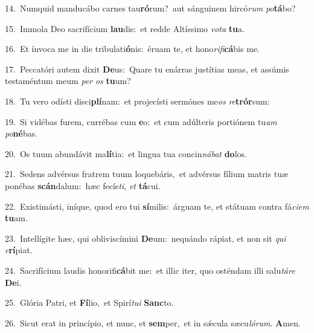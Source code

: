 {\numbfont\textcolor{\numbcolor}{14.}}~Numquid manducábo carnes tau\-\textbf{ró}\-rum?~\star aut sánguinem hircó\textit{rum} \textit{po}\-\textbf{tá}bo?\par
{\numbfont\textcolor{\numbcolor}{15.}}~Immola Deo sacrifícium \textbf{lau}\-dis:~\star et redde Altíssimo \textit{vo}\-\textit{ta} \textbf{tu}\-a.\par
{\numbfont\textcolor{\numbcolor}{16.}}~Et ínvoca me in die tribulati\-\textbf{ó}\-nis:~\star éruam te, et hono\-\textit{ri}\-\textit{fi}\textbf{cá}bis me.\par
{\numbfont\textcolor{\numbcolor}{17.}}~Peccatóri autem dixit \textbf{De}\-us:~\star Quare tu enárras justítias meas, et assúmis testaméntum meum \textit{per} \textit{os} \textbf{tu}\-um?\par
{\numbfont\textcolor{\numbcolor}{18.}}~Tu vero odísti disci\-\textbf{plí}\-nam:~\star et projecísti sermónes me\textit{os} \textit{re}\-\textbf{trór}sum:\par
{\numbfont\textcolor{\numbcolor}{19.}}~Si vidébas furem, currébas cum \textbf{e}\-o:~\star et cum adúlteris portiónem tu\textit{am} \textit{po}\-\textbf{né}bas.\par
{\numbfont\textcolor{\numbcolor}{20.}}~Os tuum abundávit ma\-\textbf{lí}\-tia:~\star et lingua tua concin\-\textit{ná}\-\textit{bat} \textbf{do}\-los.\par
{\numbfont\textcolor{\numbcolor}{21.}}~Sedens advérsus fratrem tuum loquebáris,~\dagger et advérsus fílium matris tuæ ponébas \textbf{scán}\-dalum:~\star hæc fecís\-\textit{ti}\-, \textit{et} \textbf{tá}\-cui.\par
{\numbfont\textcolor{\numbcolor}{22.}}~Existimásti, iníque, quod ero tui \textbf{sí}\-milis:~\star árguam te, et státuam contra fá\-\textit{ci}\-\textit{em} \textbf{tu}\-am.\par
{\numbfont\textcolor{\numbcolor}{23.}}~Intellígite hæc, qui obliviscímini \textbf{De}\-um:~\star nequándo rápiat, et non sit \textit{qui} \textit{e}\-\textbf{rí}piat.\par
{\numbfont\textcolor{\numbcolor}{24.}}~Sacrifícium laudis honorifi\-\textbf{cá}\-bit me:~\star et illic iter, quo osténdam illi salu\-\textit{tá}\-\textit{re} \textbf{De}\-i.\par
{\numbfont\textcolor{\numbcolor}{25.}}~Glória Patri, et \textbf{Fí}\-lio,~\star et Spirí\-\textit{tu}\-\textit{i} \textbf{Sanc}\-to.\par
{\numbfont\textcolor{\numbcolor}{26.}}~Sicut erat in princípio, et nunc, et \textbf{sem}\-per,~\star et in sǽcula sæcu\-\textit{ló}\-\textit{rum}. \textbf{A}\-men.\par
